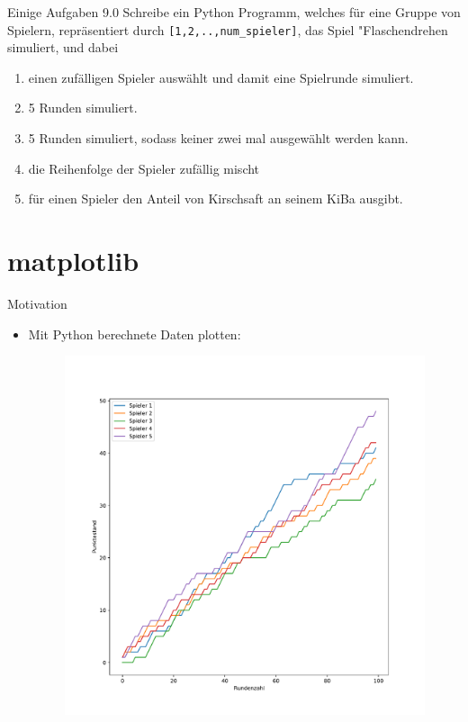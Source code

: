 \begin{frame}{Einige Aufgaben 9.0}
	Schreibe ein Python Programm, welches für eine Gruppe von Spielern, repräsentiert durch \texttt{[1,2,..,num\_spieler]}, das Spiel "Flaschendrehen\grqq{} simuliert, und dabei
	\begin{enumerate}
		\item einen zufälligen Spieler auswählt und damit eine Spielrunde simuliert.
		\item 5 Runden simuliert.
		\item 5 Runden simuliert, sodass keiner zwei mal ausgewählt werden kann.
		\item die Reihenfolge der Spieler zufällig mischt
		\item für einen Spieler den Anteil von Kirschsaft an seinem KiBa ausgibt. 
	\end{enumerate}
\end{frame}

\section{matplotlib}

\begin{frame}{Motivation}
	\begin{itemize}
		\item Mit Python berechnete Daten plotten:
		\begin{figure}[h]
			\includegraphics[width = .7\linewidth]{../images/spielplot}
		\end{figure}
	\end{itemize}
\end{frame}

